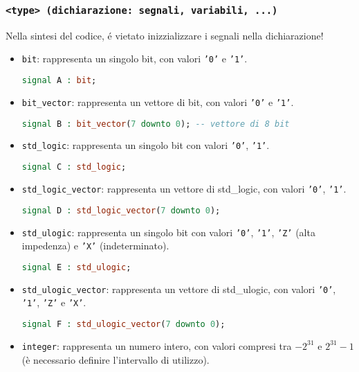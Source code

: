         \subsubsection{\texttt{<type> (dichiarazione: segnali, variabili, ...)}}
        Nella sintesi del codice, é vietato inizzializzare i segnali nella dichiarazione!
        \begin{itemize}
        \setlength\itemsep{0pt}
            \item \texttt{bit}: rappresenta un singolo bit, con valori \texttt{'0'} e \texttt{'1'}.
            \begin{lstlisting}[language=VHDL]
signal A : bit;
            \end{lstlisting}
            \item \texttt{bit\_vector}: rappresenta un vettore di bit, con valori \texttt{'0'} e \texttt{'1'}.
            \begin{lstlisting}[language=VHDL]
signal B : bit_vector(7 downto 0); -- vettore di 8 bit
            \end{lstlisting}
            \item \texttt{std\_logic}: rappresenta un singolo bit con valori \texttt{'0'}, \texttt{'1'}.
            \begin{lstlisting}[language=VHDL]
signal C : std_logic;
            \end{lstlisting}
            \item \texttt{std\_logic\_vector}: rappresenta un vettore di std\_logic, con valori \texttt{'0'}, \texttt{'1'}.
            \begin{lstlisting}[language=VHDL]
signal D : std_logic_vector(7 downto 0);
            \end{lstlisting}
            \item \texttt{std\_ulogic}: rappresenta un singolo bit con valori \texttt{'0'}, \texttt{'1'}, \texttt{'Z'} (alta impedenza) e \texttt{'X'} (indeterminato).
            \begin{lstlisting}[language=VHDL]
signal E : std_ulogic;
            \end{lstlisting}
            \item \texttt{std\_ulogic\_vector}: rappresenta un vettore di std\_ulogic, con valori \texttt{'0'}, \texttt{'1'}, \texttt{'Z'} e \texttt{'X'}.
            \begin{lstlisting}[language=VHDL]
signal F : std_ulogic_vector(7 downto 0);
            \end{lstlisting}
            \item \texttt{integer}: rappresenta un numero intero, con valori compresi tra $-2^{31}$ e $2^{31}-1$ (è necessario definire l'intervallo di utilizzo).

\end{itemize}
